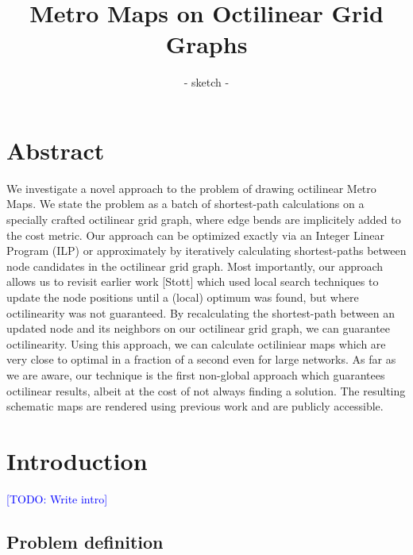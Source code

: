 \documentclass{sig-alternate-sigmod09}
\newcommand\TODO[1]{\textcolor{blue}{\small [TODO: #1]}}
\begin{document}
\title{Metro Maps on Octilinear Grid Graphs}
\subtitle{- sketch -}


\maketitle

\section{Abstract}

We investigate a novel approach to the problem of drawing octilinear Metro Maps.
We state the problem as a batch of shortest-path calculations on a specially crafted octilinear grid graph, where edge bends are implicitely added to the cost metric.
Our approach can be optimized exactly via an Integer Linear Program (ILP) or approximately by iteratively calculating shortest-paths between node candidates in the octilinear grid graph.
Most importantly, our approach allows us to revisit earlier work [Stott] which used local search techniques to update the node positions until a (local) optimum was found, but where octilinearity was not guaranteed.
By recalculating the shortest-path between an updated node and its neighbors on our octilinear grid graph, we can guarantee octilinearity.
Using this approach, we can calculate octiliniear maps which are very close to optimal in a fraction of a second even for large networks.
As far as we are aware, our technique is the first non-global approach which guarantees octilinear results, albeit at the cost of not always finding a solution. The resulting schematic maps are rendered using previous work and are publicly accessible.

\section{Introduction}

\TODO{Write intro}

\subsection{Problem definition}
\end{document}
